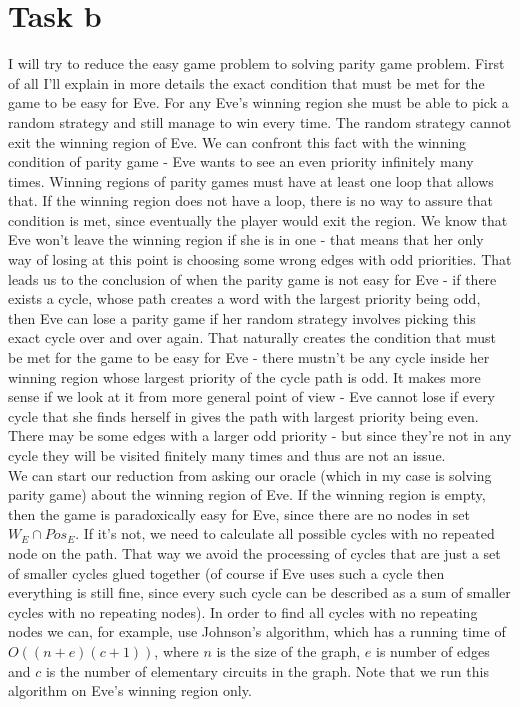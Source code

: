 \documentclass{article}
\begin{document}
\section{Task b}

I will try to reduce the easy game problem to solving parity game problem. First of all I'll explain in more details the exact condition that must be met for the game to be easy for Eve. For any Eve's winning region she must be able to pick a random strategy and still manage to win every time. The random strategy cannot exit the winning region of Eve. We can confront this fact with the winning condition of parity game - Eve wants to see an even priority infinitely many times. Winning regions of parity games must have at least one loop that allows that. If the winning region does not have a loop, there is no way to assure that condition is met, since eventually the player would exit the region. We know that Eve won't leave the winning region if she is in one - that means that her only way of losing at this point is choosing some wrong edges with odd priorities. That leads us to the conclusion of when the parity game is not easy for Eve - if there exists a cycle, whose path creates a word with the largest priority being odd, then Eve can lose a parity game if her random strategy involves picking this exact cycle over and over again. That naturally creates the condition that must be met for the game to be easy for Eve - there mustn't be any cycle inside her winning region whose largest priority of the cycle path is odd. It makes more sense if we look at it from more general point of view - Eve cannot lose if every cycle that she finds herself in gives the path with largest priority being even. There may be some edges with a larger odd priority - but since they're not in any cycle they will be visited finitely many times and thus are not an issue. \\

We can start our reduction from asking our oracle (which in my case is solving parity game) about the winning region of Eve. If the winning region is empty, then the game is paradoxically easy for Eve, since there are no nodes in set $W_{E} \cap Pos_{E}$. If it's not, we need to calculate all possible cycles with no repeated node on the path. That way we avoid the processing of cycles that are just a set of smaller cycles glued together (of course if Eve uses such a cycle then everything is still fine, since every such cycle can be described as a sum of smaller cycles with no repeating nodes). In order to find all cycles with no repeating nodes we can, for example, use Johnson's algorithm, which has a running time of $O((n + e)(c + 1))$, where $n$ is the size of the graph, $e$ is number of edges and $c$ is the number of elementary circuits in the graph. Note that we run this algorithm on Eve's winning region only.\\
\end{document}
